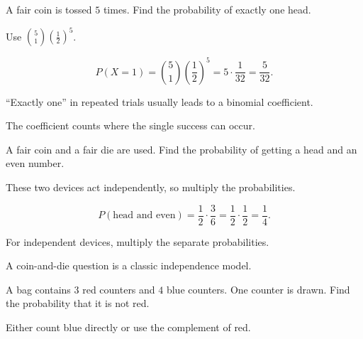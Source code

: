 \begin{problem}
A fair coin is tossed $5$ times. Find the probability of exactly one head.
\end{problem}

\begin{hint}
Use $\binom51\left(\frac12\right)^5$.
\end{hint}

\begin{solution}
\[
P(X=1)=\binom51\left(\frac12\right)^5=5\cdot \frac1{32}=\frac5{32}.
\]
\end{solution}

\begin{takeaways}
\item ``Exactly one'' in repeated trials usually leads to a binomial coefficient.
\item The coefficient counts where the single success can occur.
\end{takeaways}

\begin{problem}
A fair coin and a fair die are used. Find the probability of getting a head and an even number.
\end{problem}

\begin{hint}
These two devices act independently, so multiply the probabilities.
\end{hint}

\begin{solution}
\[
P(\text{head and even})=\frac12\cdot\frac36=\frac12\cdot\frac12=\frac14.
\]
\end{solution}

\begin{takeaways}
\item For independent devices, multiply the separate probabilities.
\item A coin-and-die question is a classic independence model.
\end{takeaways}

\begin{problem}
A bag contains $3$ red counters and $4$ blue counters. One counter is drawn. Find the probability that it is not red.
\end{problem}

\begin{hint}
Either count blue directly or use the complement of red.
\end{hint}

